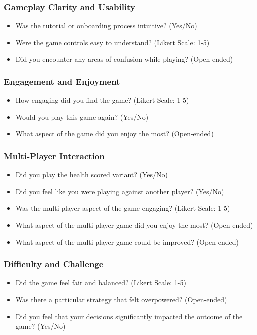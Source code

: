 \documentclass[12pt, titlepage]{article}
\begin{document}
\subsubsection{Gameplay Clarity and Usability}
\begin{itemize}
    \item Was the tutorial or onboarding process intuitive? (Yes/No)
    \item Were the game controls easy to understand? (Likert Scale: 1-5)
    \item Did you encounter any areas of confusion while playing? (Open-ended)
\end{itemize}

\subsubsection{Engagement and Enjoyment}
\begin{itemize}
    \item How engaging did you find the game? (Likert Scale: 1-5)
    \item Would you play this game again? (Yes/No)
    \item What aspect of the game did you enjoy the most? (Open-ended)
\end{itemize}

\subsubsection{Multi-Player Interaction}
\begin{itemize}
    \item Did you play the health scored variant? (Yes/No)
    \item Did you feel like you were playing against another player? (Yes/No)
    \item Was the multi-player aspect of the game engaging? (Likert Scale: 1-5)
    \item What aspect of the multi-player game did you enjoy the most? (Open-ended)
    \item What aspect of the multi-player game could be improved? (Open-ended)
\end{itemize}

\subsubsection{Difficulty and Challenge}
\begin{itemize}
    \item Did the game feel fair and balanced? (Likert Scale: 1-5)
    \item Was there a particular strategy that felt overpowered? (Open-ended)
    \item Did you feel that your decisions significantly impacted the outcome of the game? (Yes/No)
\end{itemize}
\end{document}
